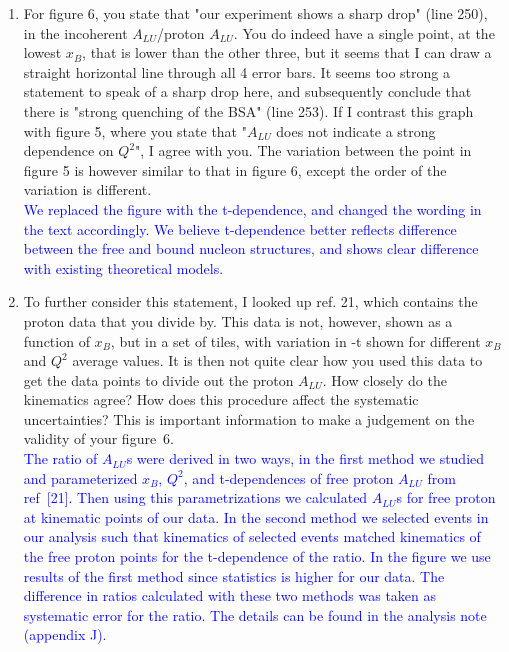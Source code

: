 \documentclass[a4paper,11pt,twoside]{article}
\begin{document}
\begin{enumerate}
  
\item    For figure 6, you state that "our experiment shows a sharp drop" (line 
   250), in the incoherent $A_{LU}$/proton $A_{LU}$. You do indeed have a 
      single point, at the lowest $x_B$, that is lower than the other three, 
      but it seems that I can draw a straight horizontal line through all 4 
      error bars. It seems too strong a statement to speak of a sharp drop 
      here, and subsequently conclude that there is "strong quenching of the 
      BSA" (line 253). If I contrast this graph with figure 5, where you state 
      that "$A_{LU}$ does not indicate a strong dependence on $Q^2$", I agree 
      with you. The variation between the point in figure 5 is however similar 
      to that in figure 6, except the order of the variation is different.\\ 
      \textcolor{blue}{We replaced the figure with the t-dependence, and 
      changed the wording in the text accordingly. We believe t-dependence 
      better reflects difference between the free and bound nucleon structures, 
      and shows clear difference with existing theoretical models.}



\item    To further consider this statement, I looked up ref. 21, which 
   contains the proton data that you divide by. This data is not, however, 
      shown as a function of $x_B$, but in a set of tiles, with variation in -t 
      shown for different $x_B$ and $Q^2$ average values. It is then not quite 
      clear how you used this data to get the data points to divide out the 
      proton $A_{LU}$. How closely do the kinematics agree? How does this 
      procedure affect the systematic uncertainties? This is important 
      information to make a judgement on the validity of your figure~6.\\
   \textcolor{blue}{The ratio of $A_{LU}$s were derived in two ways, in the  
      first method we studied and parameterized $x_B$, $Q^2$, and t-dependences 
      of free proton $A_{LU}$ from ref~[21]. Then using this parametrizations 
      we calculated $A_{LU}$s for free proton at kinematic points of our data.  
      In the second method we selected events in our analysis such that 
      kinematics of selected events matched kinematics of the free proton 
      points for the t-dependence of the ratio. In the figure we use results of 
      the first method since statistics is higher for our data. The difference 
      in ratios calculated with these two methods was taken as systematic error 
      for the ratio. The details can be found in the analysis note (appendix 
      J).  }



\end{enumerate}
\end{document}

